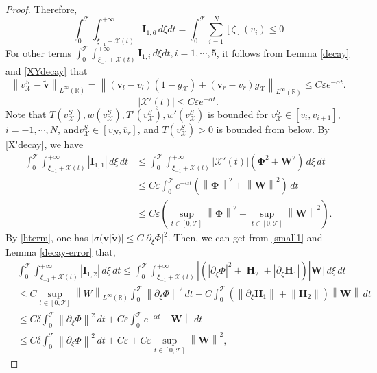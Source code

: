 \documentclass[12pt,reqno]{amsart}
\numberwithin{equation}{section}
\newcommand{\norm}[1]{\left\lVert #1 \right\rVert}
\def\p{\partial}
\def\R{\mathbb{R}}
\def\T{\mathcal{T}}
\def\supt{\mathop{sup}\limits_{t \in [0,\mathcal{T}]}}
\def\ph{\mathbf{\Phi}}
\def\w{\mathbf{W}}
\def\vsx{v^S_{\mathcal{X}}}
\def\avl{\overline{v}_l}
\def\avr{\overline{v}_r}
\def\X{\mathcal{X}}
\begin{document}
\begin{proof}
 Therefore, 
	\begin{equation}\label{flux-term1}
		\int_{0}^{\T}\int_{\xi_{-1}+\X(t)}^{+\infty}\textbf{I}_{1,6}\,d\xi dt=\int_{0}^{\T}\sum_{i=1}^{N}[\zeta](v_i)\leq 0
	\end{equation}
For other terms $\int_{0}^{\T}\int_{\xi_{-1}+\X(t)}^{+\infty}\textbf{I}_{1,i}\,d\xi dt,i=1,\cdots,5$,	it follows from Lemma \ref{decay} and \ref{XYdecay} that
	\begin{equation}\label{traveling-wave-decay}
		\norm{\vsx-\mathbf{\tilde{v}}}_{L^{\infty}(\R)}=\norm{(\mathbf{v}_l-\avl)(1-g_{\X})+(\mathbf{v}_r-\avr)g_{\X}}_{L^{\infty}(\R)}\leq C\varepsilon e^{-\alpha t}.
	\end{equation}
	\begin{equation}\label{X'decay}
		|\X'(t)|\leq C\varepsilon e^{-\alpha t}.
	\end{equation}
Note that $T(\vsx),w(\vsx),T'(\vsx),w'(\vsx)$ is bounded for $\vsx\in[v_{i},v_{i+1}]$, $i=-1,\cdots,N$, and$\vsx\in[v_N, \avr]$, and $T(\vsx)>0$ is bounded from below. By \eqref{X'decay}, we have 
\begin{equation}\label{X'est}
	\begin{aligned}
		\int_{0}^{\T}\int_{\xi_{-1}+\X(t)}^{+\infty}|\mathbf{I}_{1,1}|\,d\xi\,dt&\leq \int_{0}^{\T}\int_{\xi_{-1}+\X(t)}^{+\infty}|\X'(t)|(\ph^2+\w^2)\,d\xi\,dt\\
		&\leq C\varepsilon\int_{0}^{\T}e^{-\alpha t}(\norm{\ph}^2+\norm{\w}^2) \,dt \\
		&\leq C\varepsilon(\supt\norm{\ph}^2+\supt\norm{\w}^2).
	\end{aligned}
\end{equation}
	By \eqref{hterm}, one has $|\sigma(\mathbf{v}|\mathbf{\tilde{v}})|\leq C|\p_{\xi}\Phi|^2$. Then, we can get from \eqref{small1} and Lemma  \ref{decay-error} that,
	\begin{equation}\label{nondegenerate1}
		\begin{aligned}
			&\int_{0}^{\T} \int_{\xi_{-1}+\X(t)}^{+\infty}|\mathbf{I}_{1,2}|\,d\xi\,dt\leq\int_{0}^{\T} \int_{\xi_{-1}+\X(t)}^{+\infty}|(|\p_\xi\Phi|^2+|\mathbf{H}_2|+|\p_{\xi}\mathbf{H}_1|)|\w|\,d\xi\,dt\\
			&\leq C\supt\norm{W}_{L^{\infty}(\R)}\int_{0}^{\T}\norm{\p_{\xi}\Phi}^2\,dt+C\int_{0}^{\T} (\norm{\p_{\xi}\mathbf{H}_1}+\norm{\mathbf{H}_2})\norm{\w} \,dt\\
			&\leq C\delta\int_{0}^{\T}\norm{\p_{\xi}\Phi}^2\,dt+C\varepsilon\int_{0}^{\T} e^{-\alpha t}\norm{\w} \,dt\\
			&\leq C\delta\int_{0}^{\T}\norm{\p_{\xi}\Phi}^2\,dt+C\varepsilon+C\varepsilon \supt\norm{\w}^2,

\end{aligned}
\end{equation}
\end{proof}
\end{document}
